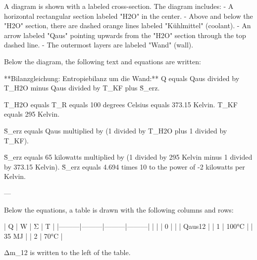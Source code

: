 A diagram is shown with a labeled cross-section. The diagram includes:  
- A horizontal rectangular section labeled "H2O" in the center.  
- Above and below the "H2O" section, there are dashed orange lines labeled "Kühlmittel" (coolant).  
- An arrow labeled "Qaus" pointing upwards from the "H2O" section through the top dashed line.  
- The outermost layers are labeled "Wand" (wall).  

Below the diagram, the following text and equations are written:  

**Bilanzgleichung: Entropiebilanz um die Wand:**  
Q equals Qaus divided by T_H2O minus Qaus divided by T_KF plus Ṡ_erz.  

T_H2O equals T_R equals 100 degrees Celsius equals 373.15 Kelvin.  
T_KF equals 295 Kelvin.  

Ṡ_erz equals Qaus multiplied by (1 divided by T_H2O plus 1 divided by T_KF).  

Ṡ_erz equals 65 kilowatts multiplied by (1 divided by 295 Kelvin minus 1 divided by 373.15 Kelvin).  
Ṡ_erz equals 4.694 times 10 to the power of -2 kilowatts per Kelvin.  

---

Below the equations, a table is drawn with the following columns and rows:  

| Q       | W       | Σ       | T       |  
|---------|---------|---------|---------|  
|         |         | 0       |         |  
| Qaus12  |         | 1       | 100°C   |  
| 35 MJ   |         | 2       | 70°C    |  

Δm_12 is written to the left of the table.